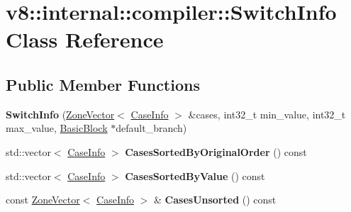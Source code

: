 \hypertarget{classv8_1_1internal_1_1compiler_1_1SwitchInfo}{}\section{v8\+:\+:internal\+:\+:compiler\+:\+:Switch\+Info Class Reference}
\label{classv8_1_1internal_1_1compiler_1_1SwitchInfo}
\subsection*{Public Member Functions}
\begin{DoxyCompactItemize}
\item 
\mbox{\label{classv8_1_1internal_1_1compiler_1_1SwitchInfo_aceb58b0ab06963cf78aa9d45a3afe855}} 
{\bfseries Switch\+Info} (\mbox{\hyperlink{classv8_1_1internal_1_1ZoneVector}{Zone\+Vector}}$<$ \mbox{\hyperlink{structv8_1_1internal_1_1compiler_1_1CaseInfo}{Case\+Info}} $>$ \&cases, int32\+\_\+t min\+\_\+value, int32\+\_\+t max\+\_\+value, \mbox{\hyperlink{classv8_1_1internal_1_1compiler_1_1BasicBlock}{Basic\+Block}} $\ast$default\+\_\+branch)
\item 
\mbox{\label{classv8_1_1internal_1_1compiler_1_1SwitchInfo_aff677b8f6810b6d7728c326b91cdc6fa}} 
std\+::vector$<$ \mbox{\hyperlink{structv8_1_1internal_1_1compiler_1_1CaseInfo}{Case\+Info}} $>$ {\bfseries Cases\+Sorted\+By\+Original\+Order} () const
\item 
\mbox{\label{classv8_1_1internal_1_1compiler_1_1SwitchInfo_af5682ca51bd2601c5957d0eebfc086ae}} 
std\+::vector$<$ \mbox{\hyperlink{structv8_1_1internal_1_1compiler_1_1CaseInfo}{Case\+Info}} $>$ {\bfseries Cases\+Sorted\+By\+Value} () const
\item 
\mbox{\label{classv8_1_1internal_1_1compiler_1_1SwitchInfo_a0055442fce360f728f8aaf30ac9aebe1}} 
const \mbox{\hyperlink{classv8_1_1internal_1_1ZoneVector}{Zone\+Vector}}$<$ \mbox{\hyperlink{structv8_1_1internal_1_1compiler_1_1CaseInfo}{Case\+Info}} $>$ \& {\bfseries Cases\+Unsorted} () const
\item 
\mbox{\label{classv8_1_1internal_1_1compiler_1_1SwitchInfo_afcce56b3d203e5d248600da74c549149}} 

\end{DoxyCompactItemize}
